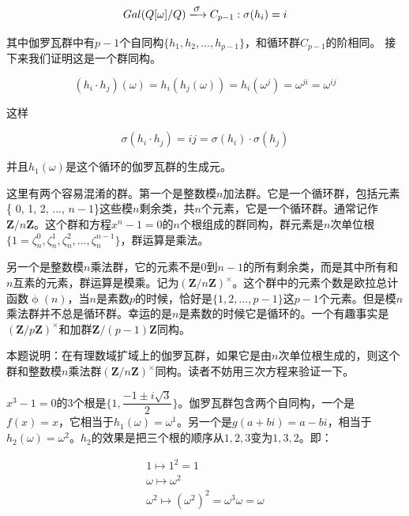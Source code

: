 \documentclass[UTF8]{article}
\begin{document}
\begin{enumerate}
\[
Gal(Q[\omega]/Q) \arrowto{\sigma} C_{p-1} :  \sigma(h_i) = i
\]

其中伽罗瓦群中有$p-1$个自同构$\{h_1, h_2, ..., h_{p-1}\}$，和循环群$C_{p-1}$的阶相同。
接下来我们证明这是一个群同构。

\[
(h_i \cdot h_j)(\omega) = h_i(h_j(\omega)) = h_i(\omega^j) = \omega^{ji} = \omega^{ij}
\]

这样

\[
\sigma(h_i \cdot h_j) = ij = \sigma(h_i) \cdot \sigma(h_j)
\]

并且$h_1(\omega)$是这个循环的伽罗瓦群的生成元。

\begin{mdframed}
这里有两个容易混淆的群。第一个是整数模$n$加法群。它是一个循环群，包括元素\{ 0, 1, 2, ..., $n - 1$\}这些模$n$剩余类，共$n$个元素，它是一个循环群。通常记作$\pmb{Z}/n\pmb{Z}$。这个群和方程$x^n - 1 = 0$的$n$个根组成的群同构，群元素是$n$次单位根$\{1 = \zeta_n^0, \zeta_n^1, \zeta_n^2, ..., \zeta_n^{n-1}\}$，群运算是乘法。

\vspace{5mm}

另一个是整数模$n$乘法群，它的元素不是0到$n-1$的所有剩余类，而是其中所有和$n$互素的元素，群运算是模乘。记为$(\pmb{Z}/n\pmb{Z})^{\times}$。这个群中的元素个数是欧拉总计函数$\upphi(n)$，当$n$是素数$p$的时候，恰好是$\{1, 2, ..., p-1\}$这$p-1$个元素。但是模$n$乘法群并不总是循环群。幸运的是$n$是素数的时候它是循环的。一个有趣事实是$(\pmb{Z}/p\pmb{Z})^{\times}$和加群$\pmb{Z}/(p-1)\pmb{Z}$同构。

\vspace{5mm}

本题说明：在有理数域扩域上的伽罗瓦群，如果它是由$n$次单位根生成的，则这个群和整数模$n$乘法群$(\pmb{Z}/n\pmb{Z})^{\times}$同构。读者不妨用三次方程来验证一下。

$x^3 - 1 = 0$的3个根是$\{1, \dfrac{-1 \pm i \sqrt{3}}{2}\}$。伽罗瓦群包含两个自同构，一个是$f(x) = x$，它相当于$h_1(\omega) = \omega^1$。另一个是$g(a + bi) = a - bi$，相当于$h_2(\omega) = \omega^2$。$h_2$的效果是把三个根的顺序从$1, 2, 3$变为$1, 3, 2$。即：

\[
\begin{array}{l}
1 \mapsto 1^2 = 1 \\
\omega \mapsto \omega^2 \\
\omega^2 \mapsto (\omega^2)^2 = \omega^3 \omega = \omega \\
\end{array}
\]

\end{mdframed}


\end{enumerate}
\end{document}
